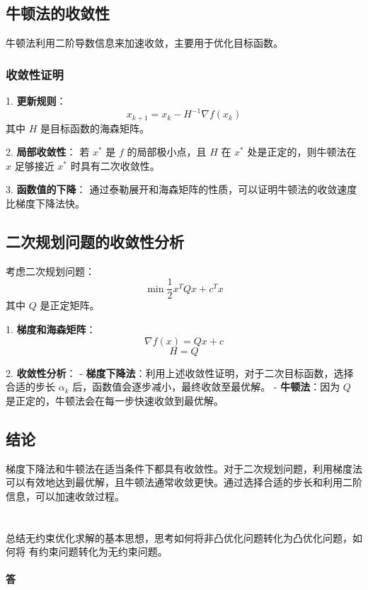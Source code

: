 \documentclass[a4paper]{article}
\begin{document}
\subsection{牛顿法的收敛性}

牛顿法利用二阶导数信息来加速收敛，主要用于优化目标函数。

\subsubsection{收敛性证明}

1. \textbf{更新规则}：
   \[
   x_{k+1} = x_k - H^{-1} \nabla f(x_k)
   \]
   其中 $H$ 是目标函数的海森矩阵。

2. \textbf{局部收敛性}：
   若 $x^*$ 是 $f$ 的局部极小点，且 $H$ 在 $x^*$ 处是正定的，则牛顿法在 $x$ 足够接近 $x^*$ 时具有二次收敛性。

3. \textbf{函数值的下降}：
   通过泰勒展开和海森矩阵的性质，可以证明牛顿法的收敛速度比梯度下降法快。

\subsection{二次规划问题的收敛性分析}

考虑二次规划问题：
\[
\min \frac{1}{2} x^T Q x + c^T x
\]
其中 $Q$ 是正定矩阵。

1. \textbf{梯度和海森矩阵}：
   \[
   \nabla f(x) = Qx + c
   \]
   \[
   H = Q
   \]

2. \textbf{收敛性分析}：
   - \textbf{梯度下降法}：利用上述收敛性证明，对于二次目标函数，选择合适的步长 $\alpha_k$ 后，函数值会逐步减小，最终收敛至最优解。
   - \textbf{牛顿法}：因为 $Q$ 是正定的，牛顿法会在每一步快速收敛到最优解。

\subsection{结论}

梯度下降法和牛顿法在适当条件下都具有收敛性。对于二次规划问题，利用梯度法可以有效地达到最优解，且牛顿法通常收敛更快。通过选择合适的步长和利用二阶信息，可以加速收敛过程。

\section{}
总结无约束优化求解的基本思想，思考如何将非凸优化问题转化为凸优化问题，如何将
有约束问题转化为无约束问题。

\paragraph{答}
\end{document}
